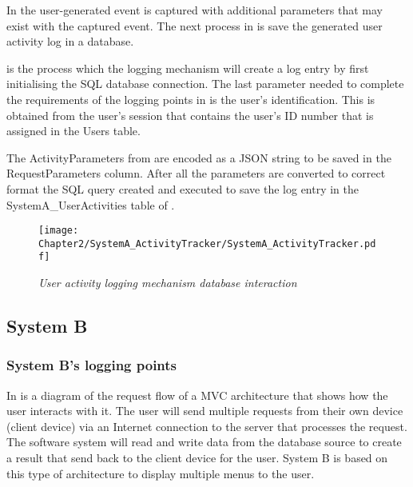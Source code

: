 In  the user-generated event is captured with additional parameters that may exist with the captured event. The next process in  is save the generated user activity log in a database.\par {} is the process which the logging mechanism will create a log entry by first initialising the SQL database connection. The last parameter needed to complete the requirements of the logging points in  is the user's identification. This is obtained from the user's session that contains the user's ID number that is assigned in the Users table.\par The ActivityParameters from   are encoded as a JSON string to be saved in the RequestParameters column. After all the parameters are converted to correct format the SQL query created and executed to save the log entry in the SystemA\_UserActivities table of .

\begin{figure}[!htb] %
	\centering %
	\texttt{[image: Chapter2/SystemA\_ActivityTracker/SystemA\_ActivityTracker.pdf]}
	\caption[User activity logging mechanism database interaction]
	{\textit{User activity logging mechanism database interaction}}\label{fig:CH2_SystemA_DB_Interaction_FlowDiagram}
\end{figure}

\clearpage

\subsection{System B}

\subsubsection{System B's logging points}

In  is a diagram of the request flow of a MVC architecture that shows how the user interacts with it. The user will send multiple requests from their own device (client device) via an Internet connection to the server that processes the request. The software system will read and write data from the database source to create a result that send back to the client device for the user. System B is based on this type of architecture to display multiple menus to the user. 

